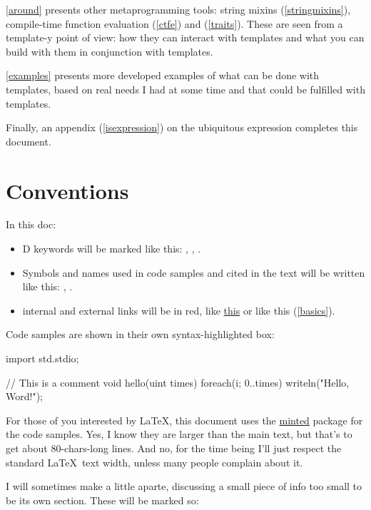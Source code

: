 \autoref{around} presents other meta\-pro\-gram\-ming tools: string mixins (\ref{stringmixins}), compile-time function evaluation (\ref{ctfe}) and  (\ref{traits}). These are seen from a template-y point of view: how they can interact with templates and what you can build with them in conjunction with templates.

\autoref{examples} presents more developed examples of what can be done with templates, based on real needs I had at some time and that could be fulfilled with templates.

Finally, an appendix (\autoref{isexpression}) on the ubiquitous  expression  completes this document.

\section*{Conventions}

In this doc:

\begin{itemize}
\item D keywords will be marked like this: , , .
\item Symbols and names used in code samples and cited in the text will be written like this: , .
\item internal and external links will be in red, like \href{http://www.dlang.org}{this} or like this (\ref{basics}).
\end{itemize}

Code samples are shown in their own syntax-highlighted box:

\begin{dcode}
import std.stdio;

// This is a comment
void hello(uint times)
{
    foreach(i; 0..times) writeln("Hello, Word!");
}
\end{dcode}

For those of you interested by \LaTeX, this document uses the \href{http://code.google.com/p/minted/}{minted} package for the code samples. Yes, I know they are larger than the main text, but that's to get about 80-chars-long lines. And no, for the time being I'll just respect the standard \LaTeX\ text width, unless many people complain about it.

I will sometimes make a little aparte, discussing a small piece of info too small to be its own section. These will be marked so:

